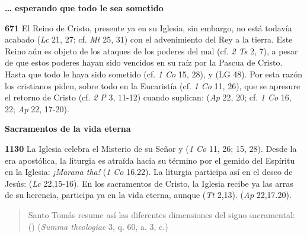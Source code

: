 \begin{body}
\textbf{\ldots{} esperando que todo le sea sometido}

\textbf{671} El Reino de Cristo, presente ya en su Iglesia, sin embargo, no está todavía acabado  (\emph{Lc} 21, 27; cf. \emph{Mt} 25, 31) con el advenimiento del Rey a la tierra. Este Reino aún es objeto de los ataques de los poderes del mal (cf. \emph{2 Ts} 2, 7), a pesar de que estos poderes hayan sido vencidos en su raíz por la Pascua de Cristo. Hasta que todo le haya sido sometido (cf. \emph{1 Co} 15, 28), y  (LG 48). Por esta razón los cristianos piden, sobre todo en la Eucaristía (cf. \emph{1 Co} 11, 26), que se apresure el retorno de Cristo (cf. \emph{2 P} 3, 11-12) cuando suplican:  (\emph{Ap} 22, 20; cf. \emph{1 Co} 16, 22; \emph{Ap} 22, 17-20).

\textbf{Sacramentos de la vida eterna}

\textbf{1130} La Iglesia celebra el Misterio de su Señor  y  (\emph{1 Co} 11, 26; 15, 28). Desde la era apostólica, la liturgia es atraída hacia su término por el gemido del Espíritu en la Iglesia: \emph{¡Marana tha!} (\emph{1 Co} 16,22). La liturgia participa así en el deseo de Jesús:  (\emph{Lc} 22,15-16). En los sacramentos de Cristo, la Iglesia recibe ya las arras de su herencia, participa ya en la vida eterna, aunque  (\emph{Tt} 2,13).  (\emph{Ap} 22,17.20).

\begin{quote} Santo Tomás resume así las diferentes dimensiones del signo sacramental:  () (\emph{Summa theologiae} 3, q. 60, a. 3, c.) \end{quote}


\end{body}
